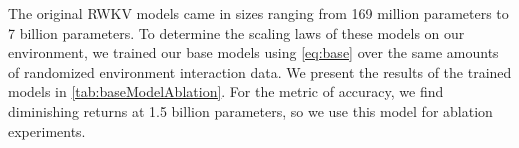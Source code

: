 The original RWKV models came in sizes ranging from 169 million parameters to 7 billion parameters. To determine the scaling laws of these models on our environment, we trained our base models using \cref{eq:base} over the same amounts of randomized environment interaction data. We present the results of the trained models in \cref{tab:baseModelAblation}. For the metric of accuracy, we find diminishing returns at 1.5 billion parameters, so we use this model for ablation experiments.


